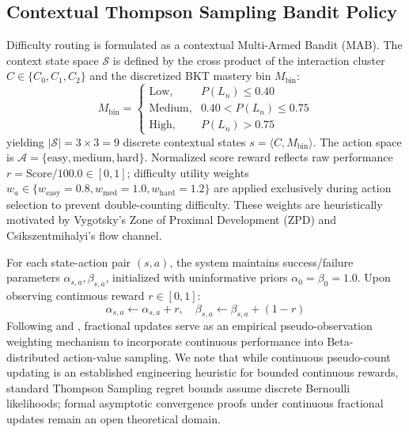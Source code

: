 \documentclass[pdflatex,sn-apa]{sn-jnl}
\begin{document}
\subsection{Contextual Thompson Sampling Bandit Policy}\label{sec4.2}

Difficulty routing is formulated as a contextual Multi-Armed Bandit (MAB). The context state space $\mathcal{S}$ is defined by the cross product of the interaction cluster $C \in \{C_0, C_1, C_2\}$ and the discretized BKT mastery bin $M_{\text{bin}}$:
\begin{equation}
M_{\text{bin}} = \begin{cases}
\text{Low}, & P(L_n) \le 0.40 \\
\text{Medium}, & 0.40 < P(L_n) \le 0.75 \\
\text{High}, & P(L_n) > 0.75
\end{cases}\label{eq7}
\end{equation}
yielding $|\mathcal{S}| = 3 \times 3 = 9$ discrete contextual states $s = \langle C, M_{\text{bin}} \rangle$. The action space is $\mathcal{A} = \{\text{easy}, \text{medium}, \text{hard}\}$. Normalized score reward reflects raw performance $r = \text{Score}/100.0 \in [0,1]$; difficulty utility weights $w_a \in \{w_{\text{easy}}=0.8, w_{\text{med}}=1.0, w_{\text{hard}}=1.2\}$ are applied exclusively during action selection to prevent double-counting difficulty. These weights are heuristically motivated by Vygotsky's Zone of Proximal Development (ZPD) and Csikszentmihalyi's flow channel.

For each state-action pair $(s,a)$, the system maintains success/failure parameters $\alpha_{s,a}, \beta_{s,a}$, initialized with uninformative priors $\alpha_0=\beta_0=1.0$. Upon observing continuous reward $r \in [0,1]$:
\begin{equation}
\alpha_{s,a} \leftarrow \alpha_{s,a} + r, \quad \beta_{s,a} \leftarrow \beta_{s,a} + (1 - r)\label{eq8}
\end{equation}
Following \citet{chapelle2011empirical} and \citet{agrawal2012analysis}, fractional updates serve as an empirical pseudo-observation weighting mechanism to incorporate continuous performance into Beta-distributed action-value sampling. We note that while continuous pseudo-count updating is an established engineering heuristic for bounded continuous rewards, standard Thompson Sampling regret bounds assume discrete Bernoulli likelihoods; formal asymptotic convergence proofs under continuous fractional updates remain an open theoretical domain.
\end{document}
